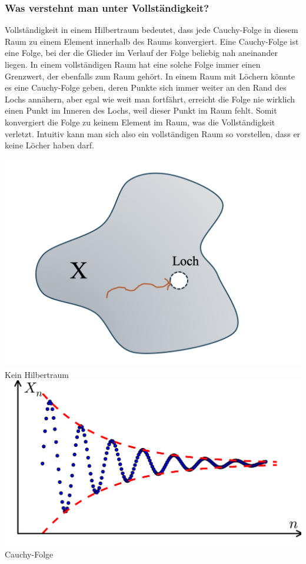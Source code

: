 \documentclass[11pt]{article}
\begin{document}
\vspace*{-0.5cm}
\subsubsection*{Was verstehnt man unter Vollständigkeit?}
\vspace*{-0.5cm}
Vollständigkeit in einem Hilbertraum bedeutet, dass jede Cauchy-Folge in diesem Raum zu einem Element innerhalb des Raums konvergiert. Eine Cauchy-Folge ist eine Folge, bei der die Glieder im Verlauf der Folge beliebig nah aneinander liegen. In einem vollständigen Raum hat eine solche Folge immer einen Grenzwert, der ebenfalls zum Raum gehört. In einem Raum mit Löchern könnte es eine Cauchy-Folge geben, deren Punkte sich immer weiter an den Rand des Lochs annähern, aber egal wie weit man fortfährt, erreicht die Folge nie wirklich einen Punkt im Inneren des Lochs, weil dieser Punkt im Raum fehlt. Somit konvergiert die Folge zu keinem Element im Raum, was die Vollständigkeit verletzt. Intuitiv kann man sich also ein vollständigen Raum so vorstellen, dass er keine Löcher haben darf.

\begin{center}
    \begin{multicols}{2}
        \includegraphics[width=0.64\linewidth]{docimgs/Kein_Hilbertraum.png}\\
        Kein Hilbertraum
        \includegraphics[width=0.8\linewidth]{docimgs/Cauchy_Folge.png}\\
        Cauchy-Folge
    \end{multicols}
\end{center}
\end{document}
